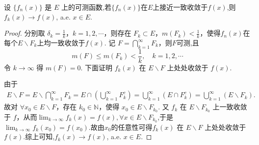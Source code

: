 \documentclass[../../main.tex]{subfiles}%
\begin{document}
\begin{theorem}\label{theorem:Egorov定理的逆定理}
设 $\{f_n(x)\}$ 是 $E$ 上的可测函数,若$\{f_n(x)\}$在$E$上接近一致收敛于$f(x)$,则$f_k(x)\to f(x)$, a.e. $x\in E$.
\end{theorem}
\begin{proof}

分别取 $\delta_k = \frac{1}{k}$，$k = 1,2,\cdots$，则存在 $F_k\subset E$，$m(F_k)<\frac{1}{k}$，使得$f_n(x)$在每个$E\backslash F_k$上均一致收敛于$f(x)$.
记 $F = \bigcap_{k = 1}^{\infty}F_k$，则$F$可测,且
\[
m(F)\leqslant m(F_k)<\frac{1}{k},\quad k = 1,2,\cdots
\]
令 $k\to\infty$ 得 $m(F) = 0$. 下面证明 $f_k(x)$ 在 $E\backslash F$ 上处处收敛于 $f(x)$.

由于
\begin{align*}
E\backslash F=E\backslash \bigcap_{k = 1}^{\infty}F_k=E\cap\left(\bigcup_{k = 1}^{\infty}F_k^c\right)
=\bigcup_{k = 1}^{\infty}(E\cap F_k^c)=\bigcup_{k = 1}^{\infty}(E\backslash F_k).
\end{align*}
故对 $\forall x_0\in E\backslash F$，存在 $k_0\in\mathbb{N}$，使得 $x_0\in E\backslash F_{k_0}$. 又 $f_k$ 在 $E\backslash F_{k_0}$ 上一致收敛于 $f$，从而$\lim_{k\to \infty}f_k(x)=f(x),\forall x\in E\backslash F_{k_0}$,于是$\lim_{k\to \infty}f_k(x_0)=f(x_0)$.故由$x_0$的任意性可得$f_k(x)$ 在 $E\backslash F$ 上处处收敛于 $f(x)$.综上可知,$f_k(x)\to f(x)$, a.e. $x\in E$.

\end{proof}
\end{document}

